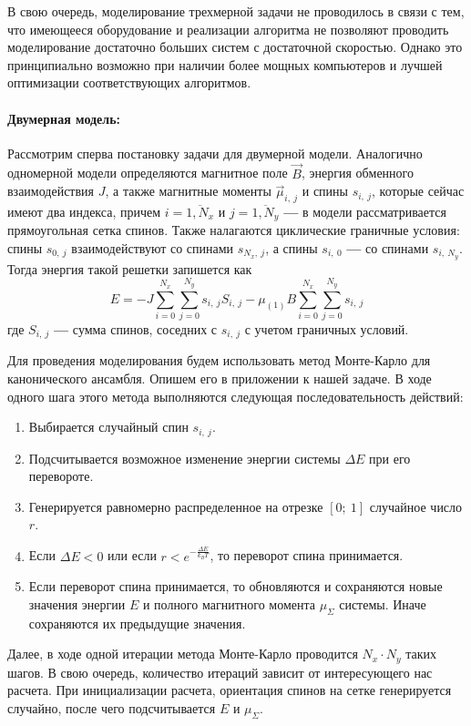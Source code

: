 \documentclass[oneside,final,14pt]{extarticle}
\begin{document}
	В свою очередь, моделирование трехмерной задачи не проводилось в связи с тем, что имеющееся оборудование и реализации алгоритма не позволяют проводить моделирование достаточно больших систем с достаточной скоростью. Однако это принципиально возможно при наличии более мощных компьютеров и лучшей оптимизации соответствующих алгоритмов. 
	\paragraph{Двумерная модель:}
	Рассмотрим сперва постановку задачи для двумерной модели. Аналогично одномерной модели определяются магнитное поле $\vec B$, энергия обменного взаимодействия $J$, а также  магнитные моменты $\vec \mu_{i,\ j}$ и спины $s_{i,\ j}$, которые сейчас имеют два индекса, причем $i=\overline{1, N_{x}}$ и $j=\overline{1, N_{y}}$ \textbf{---} в модели рассматривается прямоугольная сетка спинов. Также налагаются циклические граничные условия: спины $s_{0,\ j}$ взаимодействуют со спинами $s_{N_{x}, \ j}$, а спины $s_{i, \ 0}$ \textbf{---} со спинами $s_{i, \ N_{y}}$. Тогда энергия такой решетки запишется как 
$$E=-J\sum_{i = 0}^{N_{x}}\sum_{j=0}^{N_{y}}s_{i, \ j}S_{i, \ j}-\mu_{(1)}B\sum_{i = 0}^{N_{x}}\sum_{j=0}^{N_{y}}s_{i, \ j}$$
	где $S_{i, \ j}$ \textbf{---} сумма спинов, соседних с $s_{i, \ j}$ с учетом граничных условий. 

	Для проведения моделирования будем использовать метод Монте-Карло для канонического ансамбля. Опишем его в приложении к нашей задаче. В ходе одного шага этого метода выполняются следующая последовательность действий:
	\begin{enumerate}
	\item Выбирается случайный спин $s_{i, \ j}$.
	\item Подсчитывается возможное изменение энергии системы $\Delta E$ при его перевороте. 
	\item Генерируется равномерно распределенное на отрезке $[0; \ 1]$ случайное число $r$.
	\item Если $\Delta E < 0$ или если $r<e^{-\frac{\Delta E}{k_{B}T}}$, то переворот спина принимается.
	\item Если переворот спина принимается, то обновляются и сохраняются новые значения энергии $E$ и полного магнитного момента $\mu_{\Sigma}$ системы. Иначе сохраняются их предыдущие значения.
	\end{enumerate}
	Далее, в ходе одной итерации метода Монте-Карло проводится $N_{x} \cdot N_{y}$ таких шагов. В свою очередь, количество итераций зависит от интересующего нас расчета. При инициализации расчета, ориентация спинов на сетке генерируется случайно, после чего подсчитывается $E$ и $\mu_{\Sigma}$.
\end{document}
